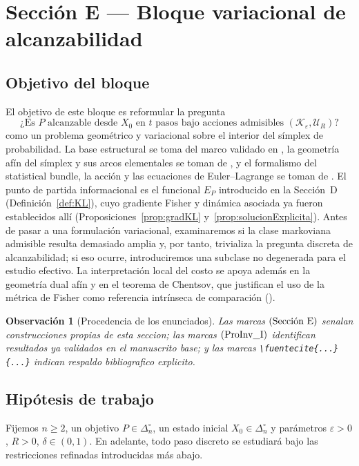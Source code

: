 ﻿\documentclass[12pt]{article}
\newcommand{\fuente}[1]{\textnormal{(#1)}}
\newtheorem{observacion}{Observación}[section]
\begin{document}
\section{Sección E — Bloque variacional de alcanzabilidad}

\subsection{Objetivo del bloque}
El objetivo de este bloque es reformular la pregunta
\[
\text{¿Es }P\text{ alcanzable desde }X_0\text{ en }t\text{ pasos bajo acciones admisibles }(\mathcal K_\varepsilon,\mathcal U_R)?
\]
como un problema geométrico y variacional sobre el interior del símplex de probabilidad. La base estructural se toma del marco validado en \cite{ControlInformacional2026}, la geometría afín del símplex y sus arcos elementales se toman de \cite{PistoneShoaib2024Axioms}, y el formalismo del statistical bundle, la acción y las ecuaciones de Euler--Lagrange se toman de \cite{Pistone2018Lagrangian}. El punto de partida informacional es el funcional $E_P$ introducido en la Sección~D (Definición~\ref{def:KL}), cuyo gradiente Fisher y dinámica asociada ya fueron establecidos allí (Proposiciones~\ref{prop:gradKL} y~\ref{prop:solucionExplicita}). Antes de pasar a una formulación variacional, examinaremos si la clase markoviana admisible resulta demasiado amplia y, por tanto, trivializa la pregunta discreta de alcanzabilidad; si eso ocurre, introduciremos una subclase no degenerada para el estudio efectivo. La interpretación local del costo se apoya además en la geometría dual afín y en el teorema de Chentsov, que justifican el uso de la métrica de Fisher como referencia intrínseca de comparación (\cite{Chentsov1982,Amari2016}).

\begin{observacion}[Procedencia de los enunciados]
Las marcas $\fuente{Sección E}$ senalan construcciones propias de esta seccion; las marcas $\fuente{ProInv\_I}$ identifican resultados ya validados en el manuscrito base; y las marcas \texttt{\textbackslash fuentecite\{...\}\{...\}} indican respaldo bibliografico explicito.
\end{observacion}

\subsection{Hipótesis de trabajo}
Fijemos \(n\ge 2\), un objetivo \(P\in\Delta_n^\circ\), un estado inicial \(X_0\in\Delta_n^\circ\) y parámetros \(\varepsilon>0\), \(R>0\), \(\delta\in(0,1)\). En adelante, todo paso discreto se estudiará bajo las restricciones refinadas introducidas más abajo.
\end{document}
